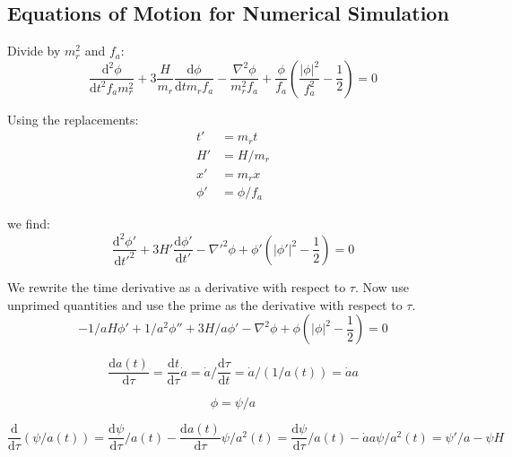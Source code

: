 \documentclass[a4paper]{article}
\begin{document}
\subsection{Equations of Motion for Numerical Simulation}

Divide by $m_r^2$ and $f_a$:
\begin{equation}
    \frac{\mathrm{d}^2 {\phi}}{\mathrm{d} t^2 f_a m_r^2} + 3 \frac{H}{m_r} \frac{\mathrm{d} \phi}{\mathrm{d} t m_r f_a} - \frac{\nabla^2 \phi}{m_r^2 f_a} + \frac{\phi}{f_a} \left( \frac{ |\phi|^2 } { f_a^2 } - \frac{1}{2} \right) = 0
\end{equation}

Using the replacements:
\begin{align}
    t' &= m_r t \\
    H' &= H / m_r \\
    x' &= m_r x \\
    \phi' &= \phi / f_a
\end{align}

we find:
\begin{equation}
    \frac{\mathrm{d}^2 \phi'}{\mathrm{d} t'^2} + 3 H' \frac{\mathrm{d} \phi'}{\mathrm{d} t'} - \nabla'^2 \phi + \phi' \left( |\phi'|^2 - \frac{1}{2} \right) = 0
\end{equation}

We rewrite the time derivative as a derivative with respect to $\tau$.
Now use unprimed quantities and use the prime as the derivative with respect to $\tau$.
\begin{equation}
    - 1/a H \phi' + 1/a^2 \phi'' + 3 H / a \phi'
    - \nabla^2 \phi + \phi \left( |\phi|^2 - \frac{1}{2} \right) = 0
\end{equation}

\begin{equation}
    \frac{\mathrm{d} a(t)}{\mathrm{d} \tau} = \frac{\mathrm{d} t}{\mathrm{d} \tau} \dot{a} = \dot{a} / \frac{\mathrm{d} \tau}{\mathrm{d} t} = \dot{a} / (1 / a(t)) = \dot{a} a
\end{equation}

\begin{equation}
    \phi = \psi / a
\end{equation}

\begin{equation}
    \frac{\mathrm{d}}{\mathrm{d} \tau} ( \psi / a(t) ) = \frac{\mathrm{d} \psi}{\mathrm{d} \tau} / a(t) - \frac{\mathrm{d} a(t)}{\mathrm{d} \tau} \psi / a^2(t)
    = \frac{\mathrm{d} \psi}{\mathrm{d} \tau} / a(t) - \dot{a} a \psi / a^2(t)
    = \psi' / a - \psi H
\end{equation}
\end{document}
